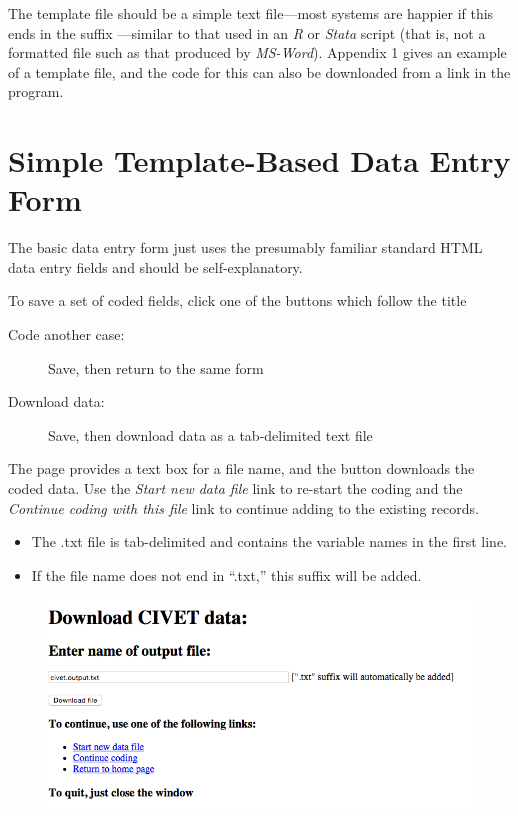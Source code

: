\documentclass[letterpaper,10pt,english]{sphinxmanual}
\begin{document}
The template file should be a simple text file—most systems are happier
if this ends in the suffix —similar to that used in an \emph{R}
or \emph{Stata} script (that is, not a formatted file such as that
produced by \emph{MS-Word}). Appendix 1 gives an example of a template
file, and the code for this can also be downloaded from a link in the
program.


\section{Simple Template-Based Data Entry Form}
\label{forms:simple-template-based-data-entry-form}
The basic data entry form just uses the presumably familiar standard
HTML data entry fields and should be self-explanatory.

To save a set of coded fields, click one of the buttons which follow the
title 
\begin{description}
\item[{Code another case:}] \leavevmode
Save, then return to the same form

\item[{Download data:}] \leavevmode
Save, then download data as a tab-delimited text file

\end{description}

The  page  provides a
text box for a file name, and the  button downloads the
coded data. Use the \emph{Start new data file} link to re-start the coding
and the \emph{Continue coding with this file} link to continue adding to the
existing records.
\begin{itemize}
\item {} 
The .txt file is tab-delimited and contains the variable names in the
first line.

\item {} 
If the file name does not end in “.txt,” this suffix will be added.

\end{itemize}
\begin{figure}[htbp]
\centering

\includegraphics{download.png}
\end{figure}
\end{document}
